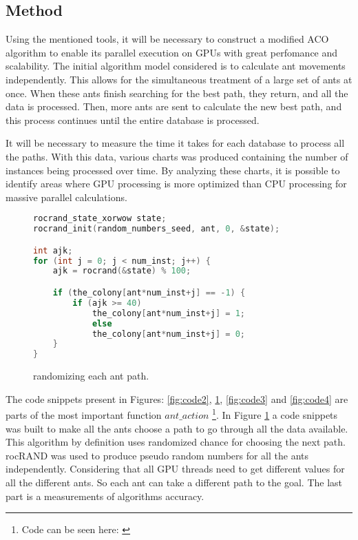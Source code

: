 \subsection{Method} \label{Method}

Using the mentioned tools, it will be necessary to construct a modified ACO algorithm to enable its
parallel execution on GPUs with great perfomance and scalability. The initial algorithm model
considered is to calculate ant movements independently. This allows for the simultaneous treatment
of a large set of ants at once. When these ants finish searching for the best path, they return,
and all the data is processed. Then, more ants are sent to calculate the new best path, and this
process continues until the entire database is processed.

It will be necessary to measure the time it takes for each database to process all the paths.
With this data, various charts was produced containing the number of instances being processed
over time. By analyzing these charts, it is possible to identify areas where GPU
processing is more optimized than CPU processing for massive parallel calculations.

\begin{figure}[h!]
\begin{lstlisting}[language=c++]
rocrand_state_xorwow state;
rocrand_init(random_numbers_seed, ant, 0, &state);

int ajk;
for (int j = 0; j < num_inst; j++) {
    ajk = rocrand(&state) % 100;

    if (the_colony[ant*num_inst+j] == -1) {
        if (ajk >= 40)
            the_colony[ant*num_inst+j] = 1;
            else
            the_colony[ant*num_inst+j] = 0;
    }
}
\end{lstlisting}
\caption{randomizing each ant path.}
\label{fig:code1}
\end{figure}

The code snippets present in Figures: \ref{fig:code2}, \ref{fig:code1}, \ref{fig:code3} and \ref{fig:code4} are parts of the most important function $ant\_action$ \footnote{Code can be seen here: \cite{santiagoParallelAco}}.
In Figure \ref{fig:code1} a code snippets was built to make all the ants choose a path to go through all the data available.
This algorithm by definition uses randomized chance for choosing the next path.
rocRAND \cite{rocrand} was used to produce pseudo random numbers for all the ants independently.
Considering that all GPU threads need to get different values for all the different ants. So each ant
can take a different path to the goal. The last part is a measurements of algorithms accuracy.

